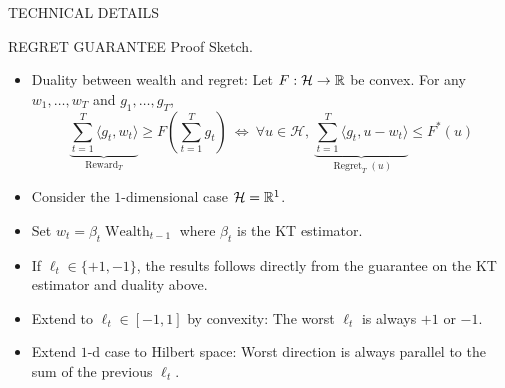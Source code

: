 \documentclass[final,t,serif,mathserif]{beamer}
\DeclareMathOperator{\Wealth}{Wealth}
\renewcommand{\H}{\mathcal{H}}  %
\DeclareMathOperator{\Regret}{Regret}
\DeclareMathOperator{\Reward}{Reward}
\begin{document}
\begin{frame}{}
\begin{columns}[t]
\begin{column}{.33\linewidth}
\begin{block}{TECHNICAL DETAILS}
\begin{minipage}{.98\linewidth}
\begin{block}{REGRET GUARANTEE}
    \alert{Proof Sketch.}
    \begin{itemize}
    \item Duality between wealth and regret: Let $F:\H \to \R$ be convex. For any $w_1, \dots, w_T$ and $g_1, \dots, g_T$,
    \[
      \underbrace{\sum_{t=1}^T \langle g_t, w_t \rangle}_{\Reward_T} \ge F\left( \sum_{t=1}^T g_t \right)
      \ \Leftrightarrow \
      \forall u \in \H, \
      \underbrace{\sum_{t=1}^T \langle g_t, u - w_t\rangle}_{\Regret_T(u)} \le F^*(u)
    \]
    \item Consider the $1$-dimensional case $\H=\R^1$.
    \item Set $w_t=\beta_t \Wealth_{t-1}$ where $\beta_t$ is the KT estimator.
    \item If $\ell_t \in \{+1, -1\}$, the results follows directly from the guarantee on the KT estimator and duality above.
    \item Extend to $\ell_t \in [-1,1]$ by convexity: The worst $\ell_t$ is always $+1$ or $-1$.
    \item Extend $1$-d case to Hilbert space: Worst direction is always parallel to the sum of the previous $\ell_t$.
    \end{itemize}
    \end{block}
    \end{minipage}
    \end{block}
\end{column}


\end{columns}
\end{frame}
\end{document}
